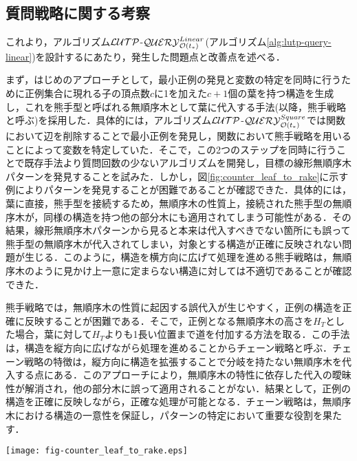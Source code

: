 \subsection{質問戦略に関する考察}
これより，アルゴリズム${\cal LUTP}$-${\cal QUERY}_{{\cal O}(t_{\ast})}^{Linear}$(アルゴリズム\ref{alg:lutp-query-linear})を設計するにあたり，発生した問題点と改善点を述べる．

まず，はじめのアプローチとして，最小正例の発見と変数の特定を同時に行うために正例集合に現れる子の頂点数$c$に1を加えた$c+1$個の葉を持つ構造を生成し，これを熊手型と呼ばれる無順序木として葉に代入する手法(以降，熊手戦略と呼ぶ)を採用した．具体的には，アルゴリズム${\cal LUTP}$-${\cal QUERY}_{{\cal O}(t_{\ast})}^{Square}$では関数において辺を削除することで最小正例を発見し，関数において熊手戦略を用いることによって変数を特定していた．そこで，この2つのステップを同時に行うことで既存手法より質問回数の少ないアルゴリズムを開発し，目標の線形無順序木パターンを発見することを試みた．しかし，図\ref{fig:counter_leaf_to_rake}に示す例によりパターンを発見することが困難であることが確認できた．具体的には，葉に直接，熊手型を接続するため，無順序木の性質上，接続された熊手型の無順序木が，同様の構造を持つ他の部分木にも適用されてしまう可能性がある．その結果，線形無順序木パターンから見ると本来は代入すべきでない箇所にも誤って熊手型の無順序木が代入されてしまい，対象とする構造が正確に反映されない問題が生じる．このように，構造を横方向に広げて処理を進める熊手戦略は，無順序木のように見かけ上一意に定まらない構造に対しては不適切であることが確認できた．

熊手戦略では，無順序木の性質に起因する誤代入が生じやすく，正例の構造を正確に反映することが困難である．そこで，正例となる無順序木の高さを$H_T$とした場合，葉に対して$H_T$よりも1長い位置まで道を付加する方法を取る．この手法は，構造を縦方向に広げながら処理を進めることからチェーン戦略と呼ぶ．チェーン戦略の特徴は，縦方向に構造を拡張することで分岐を持たない無順序木を代入する点にある．このアプローチにより，無順序木の特性に依存した代入の曖昧性が解消され，他の部分木に誤って適用されることがない．結果として，正例の構造を正確に反映しながら，正確な処理が可能となる．チェーン戦略は，無順序木における構造の一意性を保証し，パターンの特定において重要な役割を果たす．

\begin{figure*}[tb]
  \centering
  \texttt{[image: fig-counter\_leaf\_to\_rake.eps]}
  \caption{線形無順序木パターン$t$と正例となる無順序木$T$に対して，熊手戦略を用いて辺縮約と変数同定を同時に処理すると，本来であれば変数として扱うべきでない辺を誤って変数と位置づけてしまう問題が生じる．}\label{fig:counter_leaf_to_rake}
\end{figure*}

